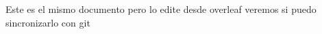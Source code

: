 \documentclass{article}
\begin{document}
	Este  es el mismo documento pero lo edite desde overleaf veremos si  puedo sincronizarlo con git
\end{document}
